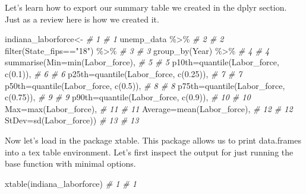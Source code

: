 \documentclass[
]{book}
\newenvironment{Shaded}{\begin{snugshade}}{\end{snugshade}}
\newcommand{\AttributeTok}[1]{\textcolor[rgb]{0.77,0.63,0.00}{#1}}
\newcommand{\CommentTok}[1]{\textcolor[rgb]{0.56,0.35,0.01}{\textit{#1}}}
\newcommand{\FloatTok}[1]{\textcolor[rgb]{0.00,0.00,0.81}{#1}}
\newcommand{\FunctionTok}[1]{\textcolor[rgb]{0.00,0.00,0.00}{#1}}
\newcommand{\NormalTok}[1]{#1}
\newcommand{\OtherTok}[1]{\textcolor[rgb]{0.56,0.35,0.01}{#1}}
\newcommand{\SpecialCharTok}[1]{\textcolor[rgb]{0.00,0.00,0.00}{#1}}
\newcommand{\StringTok}[1]{\textcolor[rgb]{0.31,0.60,0.02}{#1}}
\begin{document}
Let's learn how to export our summary table we created in the dplyr section. Just as a review here is how we created it.

\begin{Shaded}
\begin{Highlighting}[]
\NormalTok{indiana\_laborforce}\OtherTok{\textless{}{-}}                       \CommentTok{\# 1   \# 1}
\NormalTok{  unemp\_data }\SpecialCharTok{\%\textgreater{}\%}                           \CommentTok{\# 2   \# 2}
  \FunctionTok{filter}\NormalTok{(State\_fips}\SpecialCharTok{==}\StringTok{"18"}\NormalTok{) }\SpecialCharTok{\%\textgreater{}\%}             \CommentTok{\# 3   \# 3}
  \FunctionTok{group\_by}\NormalTok{(Year) }\SpecialCharTok{\%\textgreater{}\%}                       \CommentTok{\# 4   \# 4}
  \FunctionTok{summarise}\NormalTok{(}\AttributeTok{Min=}\FunctionTok{min}\NormalTok{(Labor\_force),          }\CommentTok{\# 5   \# 5}
    \AttributeTok{p10th=}\FunctionTok{quantile}\NormalTok{(Labor\_force, }\FunctionTok{c}\NormalTok{(}\FloatTok{0.1}\NormalTok{)),   }\CommentTok{\# 6   \# 6}
    \AttributeTok{p25th=}\FunctionTok{quantile}\NormalTok{(Labor\_force, }\FunctionTok{c}\NormalTok{(}\FloatTok{0.25}\NormalTok{)),  }\CommentTok{\# 7   \# 7}
    \AttributeTok{p50th=}\FunctionTok{quantile}\NormalTok{(Labor\_force, }\FunctionTok{c}\NormalTok{(}\FloatTok{0.5}\NormalTok{)),   }\CommentTok{\# 8   \# 8}
    \AttributeTok{p75th=}\FunctionTok{quantile}\NormalTok{(Labor\_force, }\FunctionTok{c}\NormalTok{(}\FloatTok{0.75}\NormalTok{)),  }\CommentTok{\# 9   \# 9}
    \AttributeTok{p90th=}\FunctionTok{quantile}\NormalTok{(Labor\_force, }\FunctionTok{c}\NormalTok{(}\FloatTok{0.9}\NormalTok{)),  }\CommentTok{\# 10  \# 10}
    \AttributeTok{Max=}\FunctionTok{max}\NormalTok{(Labor\_force),                 }\CommentTok{\# 11  \# 11}
    \AttributeTok{Average=}\FunctionTok{mean}\NormalTok{(Labor\_force),            }\CommentTok{\# 12  \# 12}
    \AttributeTok{StDev=}\FunctionTok{sd}\NormalTok{(Labor\_force))                }\CommentTok{\# 13  \# 13}
\end{Highlighting}
\end{Shaded}

Now let's load in the package xtable. This package allows us to print data.frames into a tex table environment. Let's first inspect the output for just running the base function with minimal options.

\begin{Shaded}
\begin{Highlighting}[]
  \FunctionTok{xtable}\NormalTok{(indiana\_laborforce)  }\CommentTok{\# 1  \# 1}
\end{Highlighting}
\end{Shaded}
\end{document}
